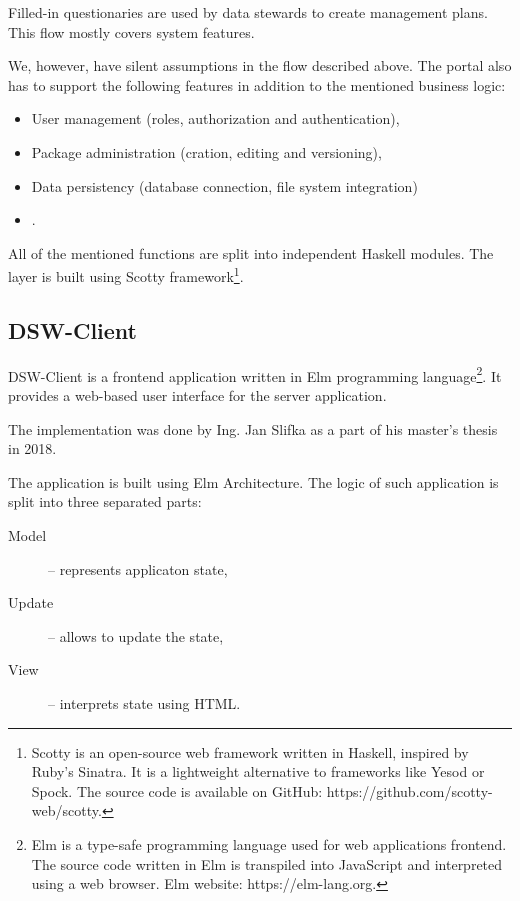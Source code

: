 Filled-in questionaries are used by data stewards to create management plans.
This flow mostly covers system features.

We, however, have silent assumptions in the flow described above.
The portal also has to support the following features in addition to the mentioned business logic:

\begin{itemize}
    \item User management (roles, authorization and authentication),
    \item Package administration (cration, editing and versioning),
    \item Data persistency (database connection, file system integration)
    \item {} .
\end{itemize}

All of the mentioned functions are split into independent Haskell modules.
The   layer is built using Scotty framework\footnote{Scotty is an open-source web framework written in Haskell, inspired by Ruby's Sinatra. It is a lightweight alternative to frameworks like Yesod or Spock. The source code is available on GitHub: https://github.com/scotty-web/scotty.}.

\subsection{DSW-Client}\label{sec:dsw-client}

DSW-Client is a frontend application written in Elm programming language\footnote{Elm is a type-safe programming language used for web applications frontend. The source code written in Elm is transpiled into JavaScript and interpreted using a web browser. Elm website: https://elm-lang.org.}.
It provides a web-based user interface for the server application.

The implementation was done by Ing. Jan Slifka as a part of his master's thesis in 2018.

The application is built using Elm Architecture.
The logic of such application is split into three separated parts:

\begin{description}
    \item[Model] -- represents applicaton state,
    \item[Update] -- allows to update the state,
    \item[View] -- interprets state using HTML.
\end{description}

